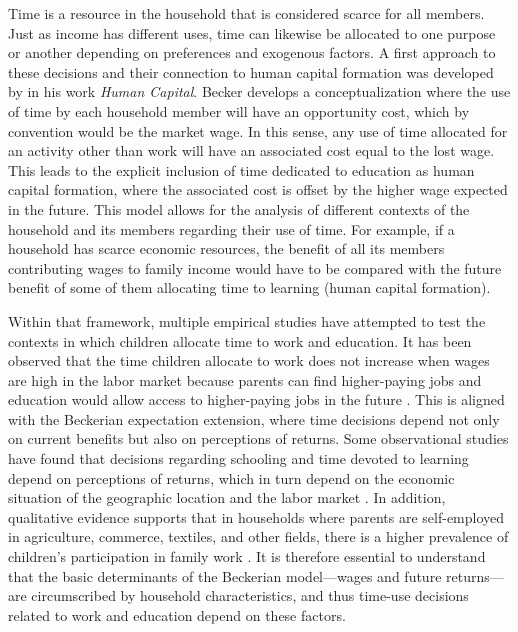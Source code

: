 \documentclass[12pt]{article}
\begin{document}
Time is a resource in the household that is considered scarce for all members.
Just as income has different uses, time can likewise be allocated to one purpose
or another depending on preferences and exogenous factors. A first approach to
these decisions and their connection to human capital formation was developed by
\citet{becker1994} in his work \textit{Human Capital}. Becker develops a
conceptualization where the use of time by each household member will have an
opportunity cost, which by convention would be the market wage. In this sense,
any use of time allocated for an activity other than work will have an
associated cost equal to the lost wage. This leads to the explicit inclusion
of time dedicated to education as human capital formation, where the associated
cost is offset by the higher wage expected in the future. This model allows
for the analysis of different contexts of the household and its members
regarding their use of time. For example, if a household has scarce economic
resources, the benefit of all its members contributing wages to family income
would have to be compared with the future benefit of some of them allocating
time to learning (human capital formation).

Within that framework, multiple empirical studies have attempted to test the
contexts in which children allocate time to work and education. It has been
observed that the time children allocate to work does not increase when wages
are high in the labor market because parents can find higher-paying jobs and
education would allow access to higher-paying jobs in the future
\citep{laszlo2008}. This is aligned with the Beckerian expectation extension,
where time decisions depend not only on current benefits but also on
perceptions of returns. Some observational studies have found that decisions
regarding schooling and time devoted to learning depend on perceptions of
returns, which in turn depend on the economic situation of the geographic
location and the labor market \citep{jensen2010, attanasio2009}. In addition,
qualitative evidence supports that in households where parents are self-employed
in agriculture, commerce, textiles, and other fields, there is a higher
prevalence of children's participation in family work \citep{rojas2013}. It
is therefore essential to understand that the basic determinants of the
Beckerian model—wages and future returns—are circumscribed by household
characteristics, and thus time-use decisions related to work and education
depend on these factors.
\end{document}
